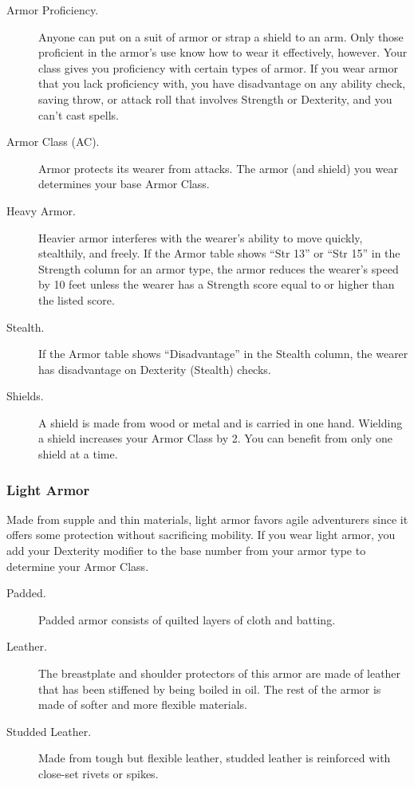 \begin{description}
\item[Armor Proficiency.]
Anyone can put on a suit of armor or strap a shield to an arm. Only
those proficient in the armor's use know how to wear it effectively,
however. Your class gives you proficiency with certain types of armor.
If you wear armor that you lack proficiency with, you have disadvantage
on any ability check, saving throw, or attack roll that involves
Strength or Dexterity, and you can't cast spells.
\item[Armor Class (AC).]
Armor protects its wearer from attacks. The armor (and shield) you wear
determines your base Armor Class.
\item[Heavy Armor.]
Heavier armor interferes with the wearer's ability to move quickly,
stealthily, and freely. If the Armor table shows ``Str 13'' or ``Str
15'' in the Strength column for an armor type, the armor reduces the
wearer's speed by 10 feet unless the wearer has a Strength score equal
to or higher than the listed score.
\item[Stealth.]
If the Armor table shows ``Disadvantage'' in the Stealth column, the
wearer has disadvantage on Dexterity (Stealth) checks.
\item[Shields.]
A shield is made from wood or metal and is carried in one hand. Wielding
a shield increases your Armor Class by 2. You can benefit from only one
shield at a time.
\end{description}

\subsubsection{Light Armor}\label{equipment-armor-light-armor}

Made from supple and thin materials, light armor favors agile
adventurers since it offers some protection without sacrificing
mobility. If you wear light armor, you add your Dexterity modifier to
the base number from your armor type to determine your Armor Class.

\begin{description}
\item[Padded.]
Padded armor consists of quilted layers of cloth and batting.
\item[Leather.]
The breastplate and shoulder protectors of this armor are made of
leather that has been stiffened by being boiled in oil. The rest of the
armor is made of softer and more flexible materials.
\item[Studded Leather.]
Made from tough but flexible leather, studded leather is reinforced with
close-set rivets or spikes.
\end{description}

